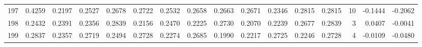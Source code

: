 \begin{tabular}{lrrrrrrrrrrrrrrr}
197 &      0.4259 &  0.2197 &  0.2527 &  0.2678 &  0.2722 &  0.2532 &  0.2658 &  0.2663 &  0.2671 &  0.2346 &   0.2815 &     0.2815 &     10 &                   -0.1444 &                    -0.2062 \\
198 &      0.2432 &  0.2391 &  0.2356 &  0.2839 &  0.2156 &  0.2470 &  0.2225 &  0.2730 &  0.2070 &  0.2239 &   0.2677 &     0.2839 &      3 &                    0.0407 &                    -0.0041 \\
199 &      0.2837 &  0.2357 &  0.2719 &  0.2494 &  0.2728 &  0.2274 &  0.2685 &  0.1990 &  0.2217 &  0.2725 &   0.2246 &     0.2728 &      4 &                   -0.0109 &                    -0.0480 \\
\bottomrule
\end{tabular}
